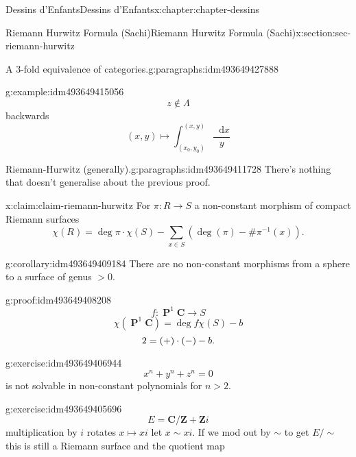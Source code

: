 \documentclass[oneside,10pt,]{book}
\newcommand{\qedhere}{\relax}
\numberwithin{equation}{section}
\newcommand{\diff}{\mathop{}\!\mathrm{d}}
\newcommand{\inv}{^{-1}}
\newcommand{\ZZ}{\mathbf{Z}}
\newcommand{\CC}{\mathbf{C}}
\DeclareMathOperator{\PP}{\mathbf{P}}
\newcommand{\gt}{>}
\begin{document}
\begin{chapterptx}{Dessins d'Enfants}{}{Dessins d'Enfants}{}{}{x:chapter:chapter-dessins}
\begin{sectionptx}{Riemann Hurwitz Formula (Sachi)}{}{Riemann Hurwitz Formula (Sachi)}{}{}{x:section:sec-riemann-hurwitz}
\begin{paragraphs}{A 3-fold equivalence of categories.}{g:paragraphs:idm493649427888}
\begin{example}{}{g:example:idm493649415056}
\begin{equation*}
\end{equation*}
%
\begin{equation*}
z\not\in \Lambda
\end{equation*}
backwards%
\begin{equation*}
(x,y) \mapsto \int_{(x_0, y_0)}^{(x,y)} \frac{\diff x}{y}
\end{equation*}
%
\end{example}
\end{paragraphs}%
\begin{paragraphs}{Riemann-Hurwitz (generally).}{g:paragraphs:idm493649411728}%
There's nothing that doesn't generalise about the previous proof.%
\begin{claim}{}{}{x:claim:claim-riemann-hurwitz}%
For \(\pi\colon R\to S\) a non-constant morphism of compact Riemann surfaces%
\begin{equation*}
\chi(R) = \deg \pi \cdot \chi(S)  - \sum_{x\in S} (\deg(\pi) - \#\pi\inv(x))\text{.}
\end{equation*}
%
\end{claim}
\begin{corollary}{}{}{g:corollary:idm493649409184}%
There are no non-constant morphisms from a sphere to a surface of genus \(\gt 0\).%
\end{corollary}
\begin{proofptx}{}{g:proof:idm493649408208}
%
\begin{equation*}
f\colon \PP^1 \CC \to S
\end{equation*}
%
\begin{equation*}
\chi(\PP^1 \CC) = \deg f \chi(S) - b
\end{equation*}
%
\begin{equation*}
2 = (+)\cdot (-) - b\text{.}\qedhere
\end{equation*}
%
\end{proofptx}
\begin{inlineexercise}{}{g:exercise:idm493649406944}%
%
\begin{equation*}
x^n  +y^ n + z^n = 0
\end{equation*}
is not solvable in non-constant polynomials for \(n \gt 2\).%
\end{inlineexercise}
\begin{inlineexercise}{}{g:exercise:idm493649405696}%
%
\begin{equation*}
E = \CC/ \ZZ + \ZZ i
\end{equation*}
multiplication by \(i\) rotates \(x \mapsto xi\) let \(x \sim xi\). If we mod out by \(\sim\) to get \(E/\sim\) this is still a Riemann surface and the quotient map%

\end{inlineexercise}
\end{paragraphs}
\end{sectionptx}
\end{chapterptx}
\end{document}

